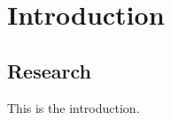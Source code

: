 \chapter{Introduction}
\label{introChapter}
\section{Research}
\label{researchSection}
This is the introduction.
